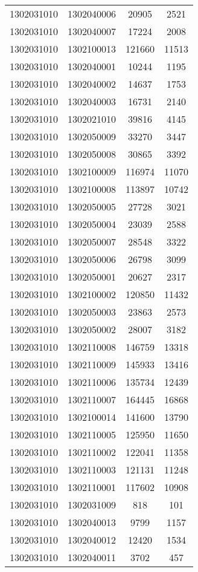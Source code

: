 \begin{longtable}{llcc}
1302031010 & 1302040006 & 20905 & 2521\\
1302031010 & 1302040007 & 17224 & 2008\\
1302031010 & 1302100013 & 121660 & 11513\\
1302031010 & 1302040001 & 10244 & 1195\\
1302031010 & 1302040002 & 14637 & 1753\\
1302031010 & 1302040003 & 16731 & 2140\\
1302031010 & 1302021010 & 39816 & 4145\\
1302031010 & 1302050009 & 33270 & 3447\\
1302031010 & 1302050008 & 30865 & 3392\\
1302031010 & 1302100009 & 116974 & 11070\\
1302031010 & 1302100008 & 113897 & 10742\\
1302031010 & 1302050005 & 27728 & 3021\\
1302031010 & 1302050004 & 23039 & 2588\\
1302031010 & 1302050007 & 28548 & 3322\\
1302031010 & 1302050006 & 26798 & 3099\\
1302031010 & 1302050001 & 20627 & 2317\\
1302031010 & 1302100002 & 120850 & 11432\\
1302031010 & 1302050003 & 23863 & 2573\\
1302031010 & 1302050002 & 28007 & 3182\\
1302031010 & 1302110008 & 146759 & 13318\\
1302031010 & 1302110009 & 145933 & 13416\\
1302031010 & 1302110006 & 135734 & 12439\\
1302031010 & 1302110007 & 164445 & 16868\\
1302031010 & 1302100014 & 141600 & 13790\\
1302031010 & 1302110005 & 125950 & 11650\\
1302031010 & 1302110002 & 122041 & 11358\\
1302031010 & 1302110003 & 121131 & 11248\\
1302031010 & 1302110001 & 117602 & 10908\\
1302031010 & 1302031009 & 818 & 101\\
1302031010 & 1302040013 & 9799 & 1157\\
1302031010 & 1302040012 & 12420 & 1534\\
1302031010 & 1302040011 & 3702 & 457\\

\end{longtable}
